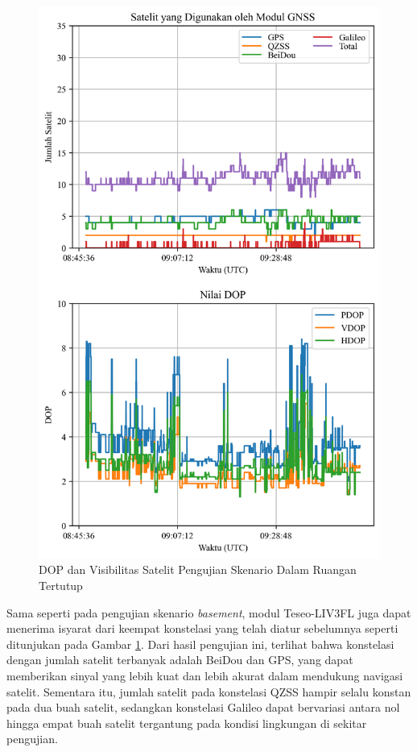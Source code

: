 \begin{figure}[H]
	\centering
	\captionsetup{justification=centering}
	\includegraphics[width=12cm]{contents/chapter-4/2-skenario-indoor/sats_dop.png}
	\caption{DOP dan Visibilitas Satelit Pengujian Skenario Dalam Ruangan Tertutup}
	\label{Fig: indoor-sats_dop}
\end{figure}

Sama seperti pada pengujian skenario \textit{basement}, modul Teseo-LIV3FL juga dapat menerima isyarat dari keempat konstelasi yang telah diatur sebelumnya seperti ditunjukan pada Gambar \ref{Fig: indoor-sats_dop}. Dari hasil pengujian ini, terlihat bahwa konstelasi dengan jumlah satelit terbanyak adalah BeiDou dan GPS, yang dapat memberikan sinyal yang lebih kuat dan lebih akurat dalam mendukung navigasi satelit. Sementara itu, jumlah satelit pada konstelasi QZSS hampir selalu konstan pada dua buah satelit, sedangkan konstelasi Galileo dapat bervariasi antara nol hingga empat buah satelit tergantung pada kondisi lingkungan di sekitar pengujian. 

